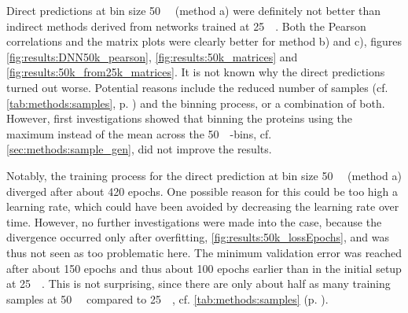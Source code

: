 Direct predictions at bin size \SI{50}{\kilo\bp} (method a) were definitely not better than indirect methods derived from networks
trained at \SI{25}{\kilo\bp}. 
Both the Pearson correlations and the matrix plots were clearly better for method b) and c),
figures \ref{fig:results:DNN50k_pearson}, \ref{fig:results:50k_matrices} and \ref{fig:results:50k_from25k_matrices}.
It is not known why the direct predictions turned out worse. 
Potential reasons include the reduced number of samples (cf. \cref{tab:methods:samples}, p. \pageref{tab:methods:samples})
and the binning process, or a combination of both.
However, first investigations showed that binning the proteins using the maximum instead of the mean across the \SI{50}{\kilo\bp}-bins, cf. \cref{sec:methods:sample_gen},
did not improve the results.

Notably, the training process for the direct prediction at bin size \SI{50}{\kilo\bp} (method a) diverged after about 420 epochs.
One possible reason for this could be too high a learning rate, which could have been avoided by decreasing the learning rate over time.
However, no further investigations were made into the case, because the divergence occurred only after overfitting, \cref{fig:results:50k_lossEpochs}, and was thus not seen as too problematic here.
The minimum validation error was reached after about 150 epochs and thus about 100 epochs earlier than in the initial setup at \SI{25}{\kilo\bp}. 
This is not surprising, since there are only about half as many training samples at \SI{50}{\kilo\bp} compared to \SI{25}{\kilo\bp}, 
cf. \cref{tab:methods:samples} (p. \pageref{tab:methods:samples}).

